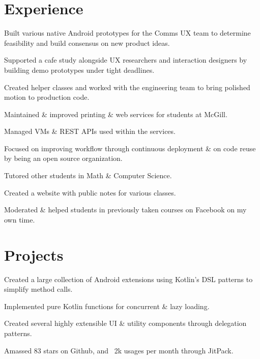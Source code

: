 \documentclass[]{allanwang-resume}
\begin{document}
\begin{minipage}[t]{0.66\textwidth}

	\section{Experience}

	\vspace{\topsep} %
	\begin{tightemize}
		\item Built various native Android prototypes for the Comms UX team to determine feasibility and build consensus on new product ideas.
		\item Supported a cafe study alongside UX researchers and interaction designers by building demo prototypes under tight deadlines.
		\item Created helper classes and worked with the engineering team to bring polished motion to production code.
	\end{tightemize}

	\begin{tightemize}
		\item Maintained \& improved printing \& web services for students at McGill.
		\item Managed VMs \& REST APIs used within the services.
		\item Focused on improving workflow through continuous deployment \& on code reuse by being an open source organization.
	\end{tightemize}

	\begin{tightemize}
		\item Tutored other students in Math \& Computer Science.
		\item Created a website with public notes for various classes.
		\item Moderated \& helped students in previously taken courses on Facebook on my own time.
	\end{tightemize}

	\sectionsep
	\section{Projects}

	\begin{tightemize}
		\item Created a large collection of Android extensions using Kotlin's DSL patterns to simplify method calls.
		\item Implemented pure Kotlin functions for concurrent \& lazy loading.
		\item Created several highly extensible UI \& utility components through delegation patterns.
		\item Amassed 83 stars on Github, and ~2k usages per month through JitPack.
	\end{tightemize}


\end{minipage}
\end{document}
